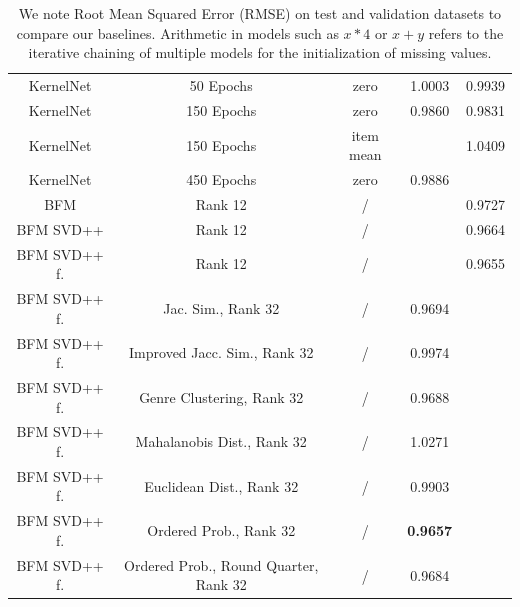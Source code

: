 \documentclass[10pt,conference,compsocconf]{IEEEtran}
\begin{document}
\begin{table}
{\begin{tabular}{|| c | c | c | c | c ||}
            KernelNet            & 50 Epochs                             & zero                    & 1.0003                 & 0.9939                  \\
            KernelNet            & 150 Epochs                            & zero                    & 0.9860                 & 0.9831                  \\
            KernelNet            & 150 Epochs                            & item mean               &                        & 1.0409                  \\
            KernelNet            & 450 Epochs                            & zero                    & 0.9886                 &                         \\
            \hline
            BFM                  & Rank 12                               & /                       &                        & 0.9727                  \\
            BFM SVD++            & Rank 12                               & /                       &                        & 0.9664                  \\
            BFM SVD++ f.         & Rank 12                               & /                       &                        & 0.9655                  \\
            BFM SVD++ f.         & Jac. Sim., Rank 32                    & /                       & 0.9694                 &                         \\
            BFM SVD++ f.         & Improved Jacc. Sim., Rank 32          & /                       & 0.9974                 &                         \\
            BFM SVD++ f.         & Genre Clustering, Rank 32             & /                       & 0.9688                 &                         \\
            BFM SVD++ f.         & Mahalanobis Dist., Rank 32            & /                       & 1.0271                 &                         \\
            BFM SVD++ f.         & Euclidean Dist., Rank 32              & /                       & 0.9903                 &                         \\
            BFM SVD++ f.         & Ordered Prob., Rank 32                & /                       & \textbf{ 0.9657 }      &                         \\
            BFM SVD++ f.         & Ordered Prob., Round Quarter, Rank 32 & /                       & 0.9684                 &                         \\
            \hline
        \end{tabular}
        }
        \caption{We note Root Mean Squared Error (RMSE) on test and validation datasets to compare our baselines.
        Arithmetic in models such as $x * 4$ or $x + y$ refers to the iterative chaining of multiple models for the initialization of missing values.
        }
        \label{tab:ablation}
    \end{table}
\end{document}
